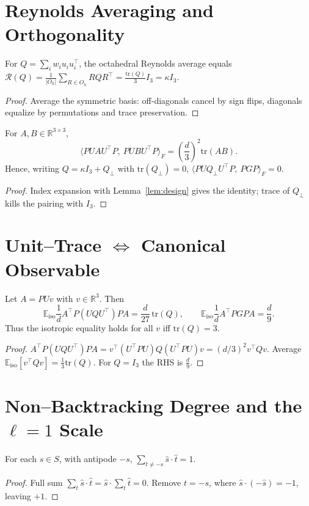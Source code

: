 \section{Reynolds Averaging and Orthogonality}
\begin{lemma}
\label{lem:reynolds}
For \(Q=\sum_i w_i u_i u_i^\top\), the octahedral Reynolds average equals
\(
\mathcal{R}(Q)=\frac{1}{|O_h|}\sum_{R\in O_h} RQR^\top=\frac{\mathrm{tr}(Q)}{3}I_3=\kappa I_3
\).
\end{lemma}
\begin{proof}
Average the symmetric basis: off-diagonals cancel by sign flips, diagonals equalize by permutations and trace preservation.
\end{proof}

\begin{lemma}
\label{lem:transfer}
For \(A,B\in\mathbb{R}^{3\times 3}\),
\[
\langle PUAU^\top P,\ PUBU^\top P\rangle_F=\left(\frac{d}{3}\right)^{\!2}\mathrm{tr}(AB).
\]
Hence, writing \(Q=\kappa I_3+Q_\perp\) with \(\mathrm{tr}(Q_\perp)=0\),
\(
\langle PUQ_\perp U^\top P,\ PGP\rangle_F=0.
\)
\end{lemma}
\begin{proof}
Index expansion with Lemma~\ref{lem:design} gives the identity; trace of \(Q_\perp\) kills the pairing with \(I_3\).
\end{proof}

\section{Unit–Trace $\Leftrightarrow$ Canonical Observable}
\begin{proposition}
\label{prop:UT}
Let \(A=PUv\) with \(v\in\mathbb{R}^3\). Then
\[
\mathbb{E}_{\mathrm{iso}}\frac{1}{d}A^\top P(UQU^\top)P A
=\frac{d}{27}\,\mathrm{tr}(Q),\qquad
\mathbb{E}_{\mathrm{iso}}\frac{1}{d}A^\top PGP A=\frac{d}{9}.
\]
Thus the isotropic equality holds for all \(v\) iff \(\mathrm{tr}(Q)=3\).
\end{proposition}
\begin{proof}
\(A^\top P(UQU^\top)P A=v^\top (U^\top P U)Q(U^\top P U)v=(d/3)^2 v^\top Q v\).
Average \(\mathbb{E}_{\mathrm{iso}}[v^\top Q v]=\tfrac{1}{3}\mathrm{tr}(Q)\). For \(Q=I_3\) the RHS is \(\frac{d}{9}\).
\end{proof}

\section{Non–Backtracking Degree and the $\ell=1$ Scale}
\begin{lemma}
\label{lem:NB}
For each \(s\in S\), with antipode \(-s\),
\(
\sum_{t\neq -s} \hat s\cdot \hat t = 1
\).
\end{lemma}
\begin{proof}
Full sum \(\sum_t \hat s\cdot\hat t=\hat s\cdot \sum_t \hat t=0\). Remove \(t=-s\), where \(\hat s\cdot(-\hat s)=-1\), leaving \(+1\).
\end{proof}

